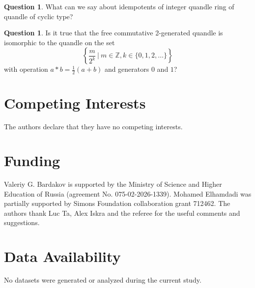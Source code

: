 \documentclass[12pt]{amsart}
\theoremstyle{definition}
\newtheorem{qst}[thm]{Question}
\theoremstyle{remark}
\begin{document}
 \begin{qst}
What can we say about idempotents of integer quandle ring of  quandle of cyclic type?
  \end{qst}
  
  \begin{qst}
 Is it true that the free commutative 2-generated quandle is isomorphic to the quandle on the set
$$
\left\{ \frac{m}{2^k} ~|~m \in \mathbb{Z},  k \in \{ 0, 1, 2, \ldots \}   \right\}
$$
with operation $a * b = \frac{1}{2} (a + b)$ and generators $0$ and $1$?
\end{qst}


\section*{Competing Interests}
The authors declare that they have no competing interests.


\section*{Funding}
Valeriy G. Bardakov is supported by the Ministry of Science and Higher Education of Russia (agreement No. 075-02-2026-1339). 	Mohamed Elhamdadi was partially supported by Simons Foundation collaboration grant 712462.  
The authors thank Luc Ta, Alex Iskra and the referee for the useful  comments and suggestions. 

	
\section*{Data Availability}
No datasets were generated or analyzed during the current study.




	
	
\end{document}
